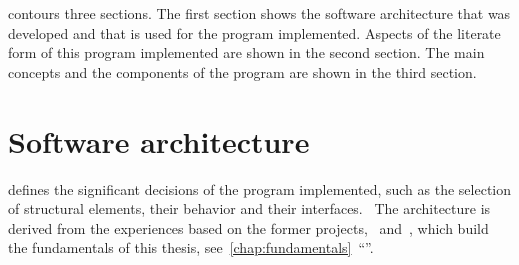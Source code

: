 \documentclass[%
    a4paper,    %
    justified,  %
    nobib,      %
    openany     %
]{tufte-book}
\makeatletter
\renewcommand{\label}[1]{\@tufte@label{##1}}%
\makeatother
\begin{document}
 contours three sections. The first section shows the
software architecture that was developed and that is used for the program
implemented. Aspects of the literate form of this program implemented are shown
in the second section. The main concepts and the components of the program are
shown in the third section.

%
%
%


\section{Software architecture}
\label{results:sec:software-architecture}

 defines the significant decisions of the
program implemented, such as the selection of structural elements, their
behavior and their interfaces.~\cite{kruchten_rup_2003} The architecture is
derived from the experiences based on the former
projects,~
and~, which build the fundamentals of this
thesis, see~\autoref{chap:fundamentals}~\enquote{}.
\end{document}
